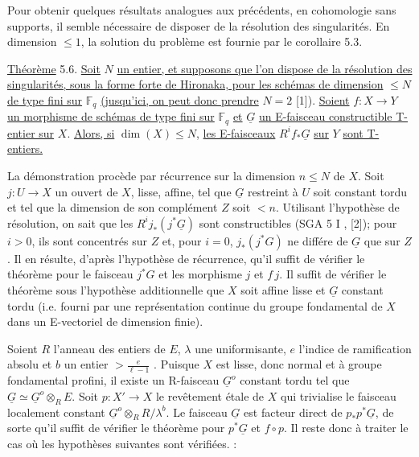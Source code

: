 
Pour obtenir quelques résultats analogues aux précédents, en cohomologie sans supports, il semble nécessaire de disposer de la résolution des singularités. En dimension $\leq 1$, la solution du problème est fournie par le corollaire 5.3.

\underline{Théorème} 5.6. \underline{Soit} $N$ \underline{un entier, et supposons que l'on dispose de la résolution des singularités, sous la forme forte de Hironaka, pour les schémas de dimension} $\leq N$ \underline{de type fini sur} $\mathbb{F}_q$ \underline{(jusqu'ici, on peut donc prendre} $N = 2$ [1]). \underline{Soient} $f : X \longrightarrow Y$ \underline{un morphisme de schémas de type fini sur} $\mathbb{F}_q$ \underline{et} $\underline{G}$ \underline{un E-faisceau constructible T-entier sur} $X$. \underline{Alors, si} $\dim(X) \leq N$, \underline{les E-faisceaux} $R^i f_*\underline{G}$ \underline{sur} $Y$ \underline{sont T-entiers.}

La démonstration procède par récurrence sur la dimension $n \leq N$ de $X$. Soit $j : U \longrightarrow X$ un ouvert de $X$, lisse, affine, tel que $\underline{G}$ restreint à $U$ soit constant tordu et tel que la dimension de son complément $Z$ soit $< n$. Utilisant l'hypothèse de résolution, on sait que les $R^i j_*(j^*\underline{G})$ sont constructibles (SGA 5 I \quad , [2]); pour $i > 0$, ils sont concentrés sur $Z$ et, pour $i = 0$, $j_*(j^*G)$ ne différe de $\underline{G}$ que sur $Z$. Il en résulte, d'après l'hypothèse de récurrence, qu'il suffit de vérifier le théorème pour le faisceau $j^*G$ et les morphisme $j$ et $f\,j$. Il suffit de vérifier le théorème sous l'hypothèse additionnelle que $X$ soit affine lisse et $\underline{G}$ constant tordu (i.e. fourni par une représentation continue du groupe fondamental de $X$ dans un E-vectoriel de dimension finie).



Soient $R$ l'anneau des entiers de $E$, $\lambda$ une uniformisante, $e$ l'indice de ramification absolu et $b$ un entier $> \frac{e}{\ell-1}$ . Puisque $X$ est lisse, donc normal et à groupe fondamental profini, il existe un R-faisceau $\underline{G}^o$ constant tordu tel que $\underline{G} \simeq \underline{G}^o \otimes_R E$. Soit $p : X' \longrightarrow X$ le revêtement étale de $X$ qui trivialise le faisceau localement constant $\underline{G}^o \otimes_R R/\lambda^b$. Le faisceau $\underline{G}$ est facteur direct de $p_*p^*\underline{G}$, de sorte qu'il suffit de vérifier le théorème pour $p^*\underline{G}$ et $f \circ p$. Il reste donc à traiter le cas où les hypothèses suivantes sont vérifiées. :

